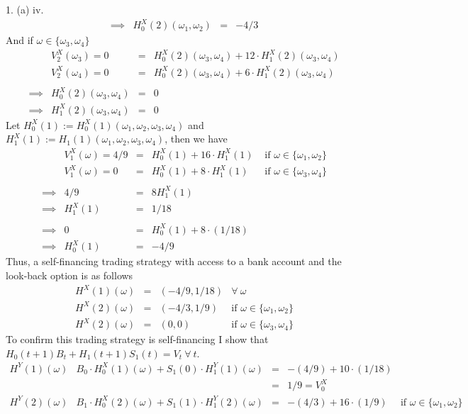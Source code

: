 \documentclass[11pt,a4paper]{article}
\begin{document}
\begin{answer}{1. (a) iv.}
\[\begin{array}{rrcl}
    \implies&H_0^X(2)(\omega_1,\omega_2)&=&-4/3
  \end{array}\]
  And if $\omega\in\{\omega_3,\omega_4\}$
  \[\begin{array}{rrcl}
    &V_2^X(\omega_3)=0&=&H_0^X(2)(\omega_3,\omega_4)+12\cdot H_1^X(2)(\omega_3,\omega_4)\\
    &V_2^X(\omega_4)=0&=&H_0^X(2)(\omega_3,\omega_4)+6\cdot H_1^X(2)(\omega_3,\omega_4)\\\\
    \implies&H_0^X(2)(\omega_3,\omega_4)&=&0\\
    \implies&H_1^X(2)(\omega_3,\omega_4)&=&0
  \end{array}\]
  Let $H_0^X(1):=H_0^X(1)(\omega_1,\omega_2,\omega_3,\omega_4)$ and $H_1^X(1):=H_1(1)(\omega_1,\omega_2,\omega_3,\omega_4)$, then we have
  \[\begin{array}{rrcll}
    &V_1^X(\omega)=4/9&=&H_0^X(1)+16\cdot H_1^X(1)&\text{ if }\omega\in\{\omega_1,\omega_2\}\\
    &V_1^X(\omega)=0&=&H_0^X(1)+8\cdot H_1^X(1)&\text{ if }\omega\in\{\omega_3,\omega_4\}\\\\
    \implies&4/9&=&8H_1^X(1)\\
    \implies&H_1^X(1)&=&1/18\\\\
    \implies&0&=&H_0^X(1)+8\cdot(1/18)\\
    \implies&H_0^X(1)&=&-4/9
  \end{array}\]
  Thus, a self-financing trading strategy with access to a bank account and the look-back option is as follows
  \[\begin{array}{rcll}
    H^X(1)(\omega)&=&(-4/9,1/18)&\forall\ \omega\\
    H^X(2)(\omega)&=&(-4/3,1/9)&\text{if }\omega\in\{\omega_1,\omega_2\}\\
    H^X(2)(\omega)&=&(0,0)&\text{if }\omega\in\{\omega_3,\omega_4\}
  \end{array}\]
  To confirm this trading strategy is self-financing I show that $H_0(t+1)B_t+H_1(t+1)S_1(t)=V_t\ \forall\ t$.
  \[\begin{array}{r|rclcll}
    H^Y(1)(\omega)&B_0\cdot H_0^X(1)(\omega)+S_1(0)\cdot H_1^Y(1)(\omega)&=&-(4/9)+10\cdot(1/18)\\
    &&=&1/9=V_0^X\\
    H^Y(2)(\omega)&B_1\cdot H_0^X(2)(\omega)+S_1(1)\cdot H_1^Y(2)(\omega)&=&-(4/3)+16\cdot(1/9)&\text{if }\omega\in\{\omega_1,\omega_2\}\\

\end{array}\]
\end{answer}
\end{document}
